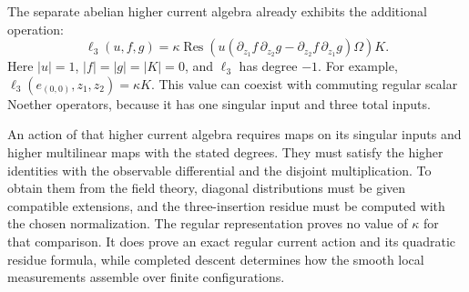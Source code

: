 The separate abelian higher current algebra already exhibits the
additional operation:
\[
 \ell_3(u,f,g)=\kappa\operatorname{Res}
 \left(u\left(\partial_{z_1}f\,\partial_{z_2}g
              -\partial_{z_2}f\,\partial_{z_1}g\right)\Omega\right)K.
\]
Here $|u|=1$, $|f|=|g|=|K|=0$, and $\ell_3$ has degree $-1$.
For example, $\ell_3(e_{(0,0)},z_1,z_2)=\kappa K$.
This value can coexist with commuting regular scalar Noether operators,
because it has one singular input and three total inputs.

An action of that higher current algebra requires maps on its singular
inputs and higher multilinear maps with the stated degrees.
They must satisfy the higher identities with the observable differential
and the disjoint multiplication.
To obtain them from the field theory, diagonal distributions must be
given compatible extensions, and the three-insertion residue must be
computed with the chosen normalization.
The regular representation proves no value of $\kappa$ for that
comparison. It does prove an exact regular current action and its
quadratic residue formula, while completed descent determines how the
smooth local measurements assemble over finite configurations.
